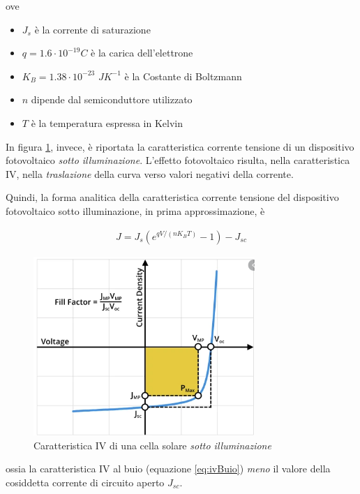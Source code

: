 \documentclass[17pt]{extarticle}
\begin{document}
ove
\begin{itemize}
	\item $J_s$ è la corrente di saturazione
	\item $q = 1.6\cdot 10^{-19}C$ è la carica dell'elettrone
	\item $K_B = 1.38\cdot 10^{-23}$ $JK^{-1}$ è la Costante di Boltzmann
	\item $n$ dipende dal semiconduttore utilizzato
	\item $T$ è la temperatura espressa in Kelvin
\end{itemize}

\vspace{2cm}

In figura \ref{fig:ivCharacteristicSolarCell}, invece, è riportata la caratteristica corrente tensione di un dispositivo fotovoltaico \emph{sotto illuminazione}. L'effetto fotovoltaico risulta, nella caratteristica IV, nella \emph{traslazione} della curva verso valori negativi della corrente.



Quindi, la forma analitica della caratteristica corrente tensione del dispositivo fotovoltaico sotto illuminazione, in prima approssimazione, è


\begin{eqnarray}
	J = J_s\left(e^{qV/(nK_BT)}-1\right) - J_{sc}
\end{eqnarray}

\begin{figure}[t]		
	\centering
   	\includegraphics[width=3.3in]{ivCharacteristicsSolarCell.png}%
  	\caption{Caratteristica IV di una cella solare \emph{sotto illuminazione} }
   	\label{fig:ivCharacteristicSolarCell}
\end{figure}

ossia la caratteristica IV al buio (equazione \ref{eq:ivBuio}) \emph{meno} il valore della cosiddetta corrente di circuito aperto $J_{sc}$.
\end{document}

